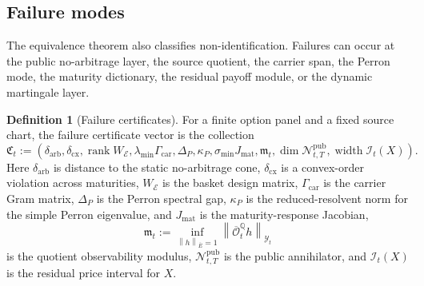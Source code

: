 \documentclass[11pt,a4paper]{amsart}
\theoremstyle{plain}
\theoremstyle{definition}
\newtheorem{definition}[theorem]{Definition}
\theoremstyle{remark}
\newcommand{\QQ}{\mathbb{Q}}
\newcommand{\cE}{\mathcal{E}}
\newcommand{\cN}{\mathcal{N}}
\newcommand{\cY}{\mathcal{Y}}
\newcommand{\norm}[1]{\left\lVert #1\right\rVert}
\begin{document}
\subsection{Failure modes}

The equivalence theorem also classifies non-identification.  Failures can occur at the public
no-arbitrage layer, the source quotient, the carrier span, the Perron mode, the maturity
dictionary, the residual payoff module, or the dynamic martingale layer.

\begin{definition}[Failure certificates]\label{def:failure-atlas-certificates}
For a finite option panel and a fixed source chart, the failure certificate vector is the
collection
\[
        \mathfrak C_t
        :=
        \left(
        \delta_{\mathrm{arb}},\delta_{\mathrm{cx}},
        \operatorname{rank}W_{\cE},
        \lambda_{\min}\Gamma_{\mathrm{car}},
        \Delta_P,
        \kappa_P,
        \sigma_{\min}J_{\mathrm{mat}},
        \mathfrak m_t,
        \dim \cN_{t,T}^{\mathrm{pub}},
        \operatorname{width}\mathcal I_t(X)
        \right).
\]
Here \(\delta_{\mathrm{arb}}\) is distance to the static no-arbitrage cone,
\(\delta_{\mathrm{cx}}\) is a convex-order violation across maturities, \(W_{\cE}\) is the basket
design matrix, \(\Gamma_{\mathrm{car}}\) is the carrier Gram matrix, \(\Delta_P\) is the Perron
spectral gap, \(\kappa_P\) is the reduced-resolvent norm for the simple Perron eigenvalue, and
\(J_{\mathrm{mat}}\) is the maturity-response Jacobian,
\[
        \mathfrak m_t
        :=
        \inf_{\norm{h}_{\bar E}=1}\norm{\overline{\mathcal O}_t^\QQ h}_{\cY_t}
\]
is the quotient observability modulus, \(\cN_{t,T}^{\mathrm{pub}}\) is the public annihilator, and
\(\mathcal I_t(X)\) is the residual price interval for \(X\).
\end{definition}
\end{document}
